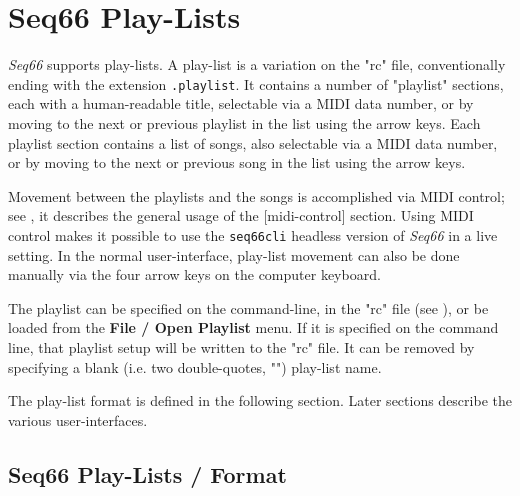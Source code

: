 %
%
%

\section{Seq66 Play-Lists}
\label{sec:playlist}

   \textsl{Seq66} supports play-lists.
   A play-list is a variation on the "rc" file, conventionally ending with the
   extension \texttt{.playlist}.  It contains a number of "playlist" sections,
   each with a human-readable title, selectable via a MIDI data number,
   or by moving to the next or previous playlist in the list using the arrow
   keys.
   Each playlist section contains a list of songs, also selectable via a MIDI
   data number, or by moving to the next or previous song in the list using the
   arrow keys.

   Movement between the playlists and the songs is accomplished via 
   MIDI control; see
   ,
   it describes the general usage of the [midi-control] section.
   Using MIDI control makes it possible to use the \texttt{seq66cli}
   headless version of \textsl{Seq66} in a live setting.
   In the normal user-interface, play-list movement
   can also be done manually via the four arrow keys on the computer
   keyboard.

   The playlist can be specified on the command-line, in
   the "rc" file (see ), or be loaded
   from the \textbf{File / Open Playlist} menu.
   If it is specified on the command line, that playlist setup will
   be written to the "rc" file.  It can be removed by specifying a blank (i.e.
   two double-quotes, "") play-list name.

   The play-list format is defined in the following section.
   Later sections describe the various user-interfaces.

\subsection{Seq66 Play-Lists / Format}
\label{subsec:playlist_setup}

